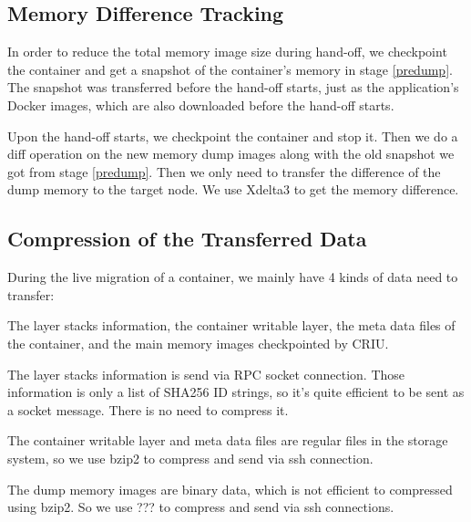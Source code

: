 \subsection{Memory Difference Tracking}
In order to reduce the total memory image size during hand-off, we checkpoint the container and get a snapshot of the container's memory in stage \ref{predump}. The snapshot was transferred before the hand-off starts, just as the application's Docker images, which are also downloaded before the hand-off starts.

Upon the hand-off starts, we checkpoint the container and stop it. Then we do a diff operation on the new memory dump images along with the old snapshot we got from stage \ref{predump}. Then we only need to transfer the difference of the dump memory to the target node. We use Xdelta3 to get the memory difference.


\subsection{Compression of the Transferred Data}

During the live migration of a container, we mainly have 4 kinds of data need to transfer:

The layer stacks information, the container writable layer, the meta data files of the container, and the main memory images checkpointed by CRIU. 


The layer stacks information is send via RPC socket connection. Those information is only a list of SHA256 ID strings, so it's quite efficient to be sent as a socket message. There is no need to compress it.

The container writable layer and meta data files are regular files in the storage system, so we use bzip2  to compress and send via ssh connection.

The dump memory images are binary data, which is not efficient to compressed using bzip2. So we use ??? to compress and send via ssh connections.



